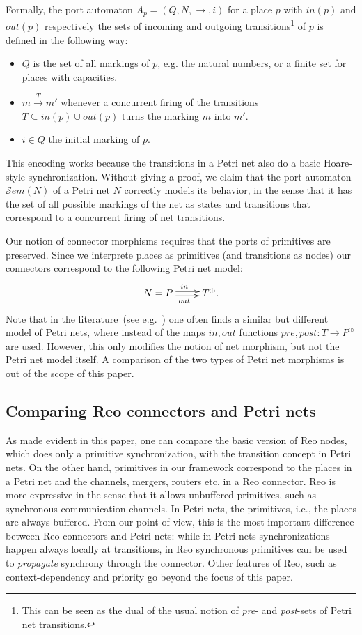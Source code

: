 \documentclass[copyright,creativecommons]{eptcs}
\newcommand{\Sem}{\ensuremath{\mathcal{S}em}}
\begin{document}
Formally, the port automaton
$A_p=(Q,N,\to,i)$ for a place $p$ with $in(p)$ and $out(p)$ respectively 
the sets of incoming and outgoing transitions\footnote{This can be seen
as the dual of the usual notion of \emph{pre}- and \emph{post}-sets of Petri net transitions.}
of $p$ is defined in the following way:
\begin{itemize}
  \item $Q$ is the set of all markings of $p$, e.g. the natural numbers, or a
  finite set for places with capacities.
  \item $m \overset{T}{\longrightarrow} m'$ whenever a concurrent firing of
  the transitions $T \subseteq in(p) \cup out(p)$ turns the marking $m$ into $m'$. 
  \item $i\in Q$ the initial marking of $p$.
\end{itemize}
This encoding works because the transitions in a Petri net also do a basic
Hoare-style synchronization. Without giving a proof, we claim that the port
automaton $\Sem(N)$ of a Petri net $N$ correctly models its behavior, in the
sense that it has the set of all possible markings of the net as states and
transitions that correspond to a concurrent firing of net transitions.

Our notion of connector morphisms requires that the ports of primitives are preserved.
Since we interprete places as primitives (and transitions as nodes) our connectors
correspond to the following Petri net model:
\vspace{-0.2cm}
\[
\xymatrix{
N=P \ar@<0.5ex>[r]^{in} \ar@<-0.5ex>[r]_{out} & T^{\oplus}.
}
\]
Note that in the literature~(see e.g.~\cite{PER01}) one often finds
a similar but different model of Petri nets, where instead of the maps $in,out$ 
functions $pre,post: T \to P^{\oplus}$ are used. However, this only modifies the
notion of net morphism, but not the Petri net model itself. A comparison of the
two types of Petri net morphisms is out of the scope of this paper.


\subsection{Comparing Reo connectors and Petri nets}

As made evident in this paper, one can compare the basic version of Reo nodes, which
does only a primitive synchronization, with the transition concept in Petri nets.
On the other hand, primitives in our framework correspond to the places in a Petri net
and the channels, mergers, routers etc. in a Reo connector. Reo is more expressive
in the sense that it allows unbuffered  primitives, such as synchronous communication 
channels. In Petri nets, the primitives, i.e., the places are always buffered. 
From our point of view, this is the most important difference between Reo connectors 
and Petri nets: while in Petri nets synchronizations happen always locally at transitions,
in Reo synchronous primitives can be used to \emph{propagate} synchrony through the 
connector. Other features of Reo, such as context-dependency and priority go
beyond the focus of this paper.
\end{document}
